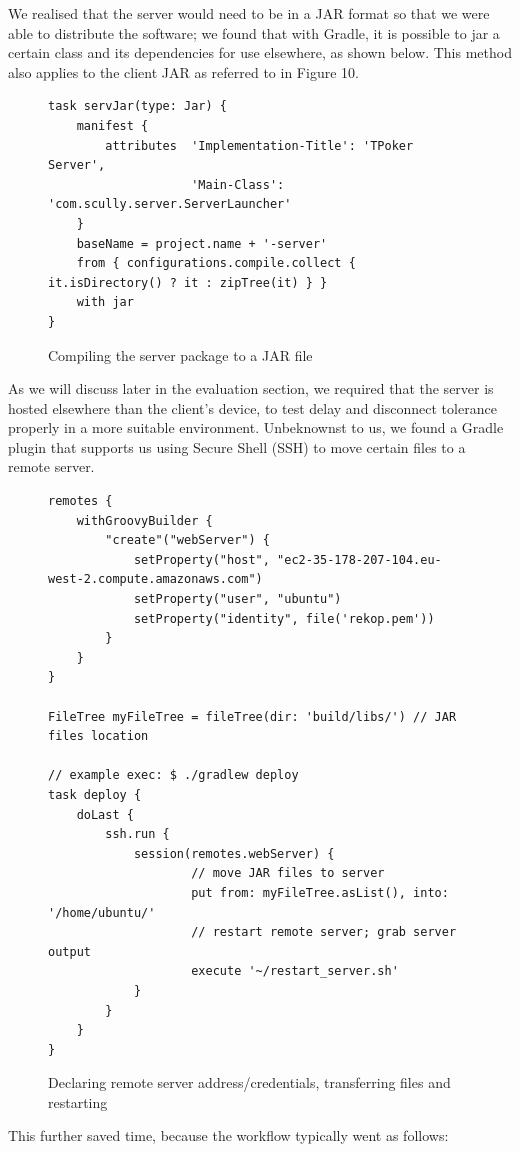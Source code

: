 \documentclass[11pt]{article}
\begin{document}
We realised that the server would need to be in a JAR format so that we were able to distribute the software; we found that with Gradle, it is possible to jar a certain class and its dependencies for use elsewhere, as shown below. This method also applies to the client JAR as referred to in Figure 10.
\begin{figure}[h]
\begin{lstlisting}[frame=single,framexleftmargin=10pt, framexrightmargin=15pt]
task servJar(type: Jar) {
    manifest {
        attributes 	'Implementation-Title': 'TPoker Server',
					'Main-Class': 'com.scully.server.ServerLauncher'
    }
    baseName = project.name + '-server'
    from { configurations.compile.collect { it.isDirectory() ? it : zipTree(it) } }
    with jar
}
\end{lstlisting}
\caption{Compiling the server package to a JAR file}
\end{figure}
\newpage
As we will discuss later in the evaluation section, we required that the server is hosted elsewhere than the client's device, to test delay and disconnect tolerance properly in a more suitable environment. Unbeknownst to us, we found a Gradle plugin that supports us using Secure Shell (SSH) to move certain files to a remote server. \\
\begin{figure}[h]
\begin{lstlisting}[frame=single,framexleftmargin=10pt, framexrightmargin=15pt]
remotes {
    withGroovyBuilder {
        "create"("webServer") {
            setProperty("host", "ec2-35-178-207-104.eu-west-2.compute.amazonaws.com")
            setProperty("user", "ubuntu")
            setProperty("identity", file('rekop.pem'))
        }
    }
}

FileTree myFileTree = fileTree(dir: 'build/libs/') // JAR files location

// example exec: $ ./gradlew deploy
task deploy {
    doLast {
        ssh.run {
            session(remotes.webServer) {
					// move JAR files to server
                	put from: myFileTree.asList(), into: '/home/ubuntu/' 
                	// restart remote server; grab server output
                	execute '~/restart_server.sh' 
            }
        }
    }
}
\end{lstlisting}
\caption{Declaring remote server address/credentials, transferring files and restarting}
\end{figure}

\newpage
This further saved time, because the workflow typically went as follows: \\
\end{document}
